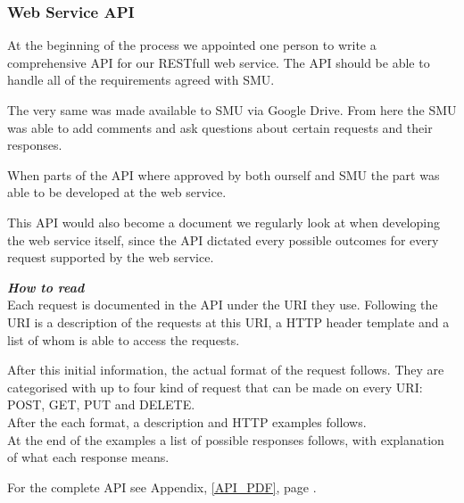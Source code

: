 \subsubsection{Web Service API}
At the beginning of the process we appointed one person to write a comprehensive API for our RESTfull web service.
The API should be able to handle all of the requirements agreed with SMU.

The very same was made available to SMU via Google Drive. From here the SMU was able to add comments and ask questions about certain requests and their responses.

When parts of the API where approved by both ourself and SMU the part was able to be developed at the web service.

This API would also become a document we regularly look at when developing the web service itself, since the API dictated every possible outcomes for every request supported by the web service.

\textit{\textbf{How to read}}\\
Each request is documented in the API under the URI they use. Following the URI is a description of the requests at this URI, a HTTP header template and a list of whom is able to access the requests.

After this initial information, the actual format of the request follows. They are categorised with up to four kind of request that can be made on every URI: POST, GET, PUT and DELETE. \\
After the each format, a description and HTTP examples follows. \\
At the end of the examples a list of possible responses follows, with explanation of what each response means.

For the complete API see Appendix, \ref{API_PDF}, page \pageref{API_PDF}.